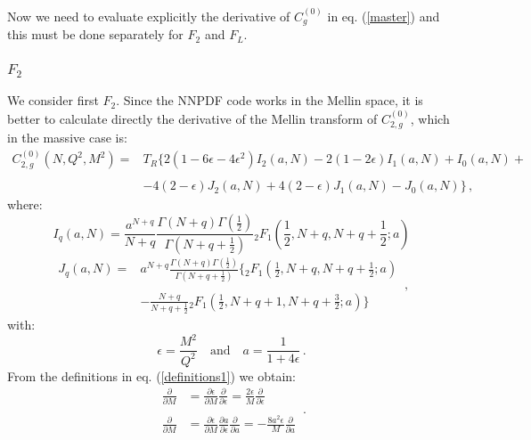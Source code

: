 \documentclass[10pt,a4paper]{article}
\begin{document}
Now we need to evaluate explicitly the derivative of $C_g^{(0)}$ in eq. (\ref{master}) and this must be done separately for $F_2$ and $F_L$. 

\subsubsection{$F_2$}

We consider first $F_2$. Since the NNPDF code works in the Mellin space, it is better to calculate directly the derivative of the Mellin transform of $C_{2,g}^{(0)}$, which in the massive case is:
\begin{equation}
\begin{array}{rl}
\displaystyle C_{2,g}^{(0)}(N,Q^2,M^2)=&\displaystyle T_R\Big\{2(1-6\epsilon-4\epsilon^2)I_2(a,N)-2(1-2\epsilon)I_1(a,N)+I_0(a,N)+\\
\\
& \displaystyle -4(2-\epsilon)J_2(a,N)+4(2-\epsilon)J_1(a,N)-J_0(a,N)\Big\}\,,
\end{array}
\end{equation}
where:
\begin{equation}\label{iq}
I_q(a,N) = \frac{a^{N+q}}{N+q}\frac{\Gamma(N+q)\Gamma(\frac12)}{\Gamma(N+q+\frac12)} {_2F_1}\left(\frac12,N+q,N+q+\frac12;a\right)
\end{equation}
\begin{equation}\label{jq}
\begin{array}{rl}
J_q(a,N) =&\displaystyle a^{N+q}\frac{\Gamma(N+q)\Gamma(\frac12)}{\Gamma(N+q+\frac12)}\bigg\{{_2F_1}\left(\frac12,N+q,N+q+\frac12;a\right)\\
\\
&\displaystyle -\frac{N+q}{N+q+\frac12}{_2F_1}\left(\frac12,N+q+1,N+q+\frac32;a\right)\bigg\}
\end{array}\,,
\end{equation}
with:
\begin{equation}\label{definitions1}
\epsilon = \frac{M^2}{Q^2}\quad\mbox{and}\quad a=\frac1{1+4\epsilon}\,.
\end{equation}
From the definitions in eq. (\ref{definitions1}) we obtain:
\begin{equation}\label{gngngngngng}
\begin{array}{rl}
\displaystyle \frac{\partial}{\partial M} &\displaystyle = \frac{\partial \epsilon}{\partial M} \frac{\partial}{\partial \epsilon} = \frac{2\epsilon}{M}\frac{\partial}{\partial \epsilon}\\
\\
\displaystyle \frac{\partial}{\partial M} &\displaystyle = \frac{\partial \epsilon}{\partial M} \frac{\partial a}{\partial \epsilon} \frac{\partial}{\partial a} = -\frac{8a^2\epsilon}{M}\frac{\partial}{\partial a}
\end{array}\,.
\end{equation}
\end{document}
